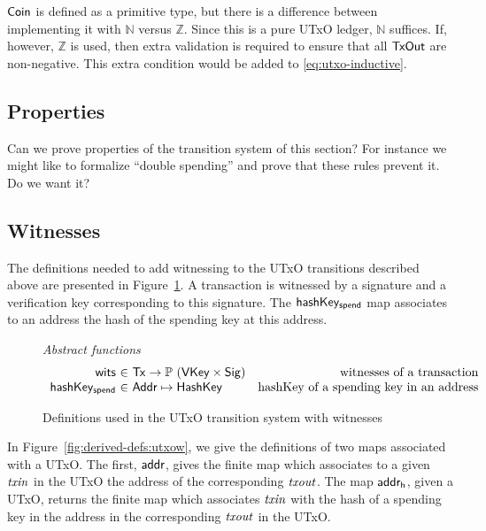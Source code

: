 \documentclass[11pt,a4paper]{article}
\newcommand{\Tx}{\type{Tx}}
\newcommand{\Addr}{\type{Addr}}
\newcommand{\Coin}{\type{Coin}}
\newcommand{\TxOut}{\type{TxOut}}
\newcommand{\VKey}{\type{VKey}}
\newcommand{\HashKey}{\type{HashKey}}
\newcommand{\Sig}{\type{Sig}}
\theoremstyle{definition}
\theoremstyle{definition}
\begin{document}
\begin{note}
  $\Coin$ is defined as a primitive type, but there is a difference
  between implementing it with $\mathbb{N}$ versus $\mathbb{Z}$.
  Since this is a pure UTxO ledger, $\mathbb{N}$ suffices.
  If, however, $\mathbb{Z}$ is used, then extra validation is required
  to ensure that all $\TxOut$ are non-negative.
  This extra condition would be added to \cref{eq:utxo-inductive}.
\end{note}

\subsection{Properties}
\label{sec:utxo-properties}

\begin{todo}
  Can we prove properties of the transition system of this section? For
  instance we might like to formalize ``double spending'' and prove that these
  rules prevent it. Do we want it?
\end{todo}


\subsection{Witnesses}
\label{sec:witnesses}

The definitions needed to add witnessing to the UTxO transitions described above
are presented in Figure~\ref{fig:defs:utxow}. A transaction is witnessed by
a signature and a verification key corresponding to this signature. The
$\mathsf{hashKey_{spend}}$ map associates to an address the hash of the spending key
at this address.

\begin{figure}
  \emph{Abstract functions}
  \begin{equation*}
    \begin{array}{r@{~\in~}lr}
      \fun{wits} & \Tx \to \powerset{(\VKey \times \Sig)}
      & \text{witnesses of a transaction}\\
      \fun{hashKey_{spend}} & \Addr \mapsto \HashKey
      & \text{hashKey of a spending key in an address}\\
    \end{array}
  \end{equation*}
  \caption{Definitions used in the UTxO transition system with witnesses}
  \label{fig:defs:utxow}
\end{figure}

In Figure~\ref{fig:derived-defs:utxow}, we give the definitions of two maps
associated with a UTxO. The first, $\mathsf{addr}$, gives the finite map
which associates to a given $\mathit{txin}$ in the UTxO the address of the
corresponding $\mathit{txout}$. The map $\mathsf{addr_h}$, given a UTxO, returns the
finite map which associates $\mathit{txin}$ with the hash of a spending key in
the address in the corresponding $\mathit{txout}$ in the UTxO.
\end{document}
